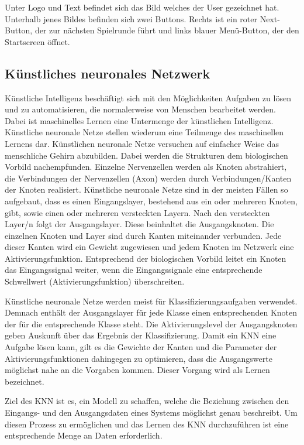 \documentclass[11pt]{article}
\begin{document}
Unter Logo und Text befindet sich das Bild welches der User gezeichnet hat. Unterhalb jenes Bildes befinden sich zwei Buttons. Rechts ist ein roter Next-Button, der zur nächsten Spielrunde führt und links blauer Menü-Button, der den Startscreen öffnet.



\subsection{Künstliches neuronales Netzwerk}

Künstliche Intelligenz beschäftigt sich mit den Möglichkeiten Aufgaben zu lösen und zu automatisieren, die normalerweise von Menschen bearbeitet werden. Dabei ist maschinelles Lernen eine Untermenge der künstlichen Intelligenz. Künstliche neuronale Netze stellen wiederum eine Teilmenge des maschinellen Lernens dar. Künstlichen neuronale Netze versuchen auf einfacher Weise das menschliche Gehirn abzubilden. Dabei werden die Strukturen dem biologischen Vorbild nachempfunden. Einzelne Nervenzellen werden als Knoten abstrahiert, die Verbindungen der Nervenzellen (Axon) werden durch Verbindungen/Kanten der Knoten realisiert. Künstliche neuronale Netze sind in der meisten Fällen so aufgebaut, dass es einen Eingangslayer, bestehend aus ein oder mehreren Knoten, gibt, sowie einen oder mehreren versteckten Layern. Nach den versteckten Layer/n folgt der Ausgangslayer. Diese beinhaltet die Ausgangsknoten. Die einzelnen Knoten und Layer sind durch Kanten miteinander verbunden. Jede dieser Kanten wird ein Gewicht zugewiesen und jedem Knoten im Netzwerk eine Aktivierungsfunktion. Entsprechend der biologischen Vorbild leitet ein Knoten das Eingangssignal weiter, wenn die Eingangssignale eine entsprechende Schwellwert (Aktivierungsfunktion) überschreiten.

Künstliche neuronale Netze werden meist für Klassifizierungsaufgaben verwendet. Demnach enthält der Ausgangslayer für jede Klasse einen entsprechenden Knoten der für die entsprechende Klasse steht. Die Aktivierungslevel der Ausgangsknoten geben Auskunft über das Ergebnis der Klassifizierung.  Damit ein KNN eine Aufgabe lösen kann, gilt es die Gewichte der Kanten und die Parameter der Aktivierungsfunktionen dahingegen zu optimieren, dass die Ausgangswerte möglichst nahe an die Vorgaben kommen. Dieser Vorgang wird als Lernen bezeichnet.

Ziel des KNN ist es, ein Modell zu schaffen, welche die Beziehung zwischen den Eingangs- und den Ausgangsdaten eines Systems möglichst genau beschreibt. Um diesen Prozess zu ermöglichen und das Lernen des KNN durchzuführen ist eine entsprechende Menge an Daten erforderlich.\parencite{M.AnderssonM.Arvola}\parencite{Chollet2017}
\end{document}
